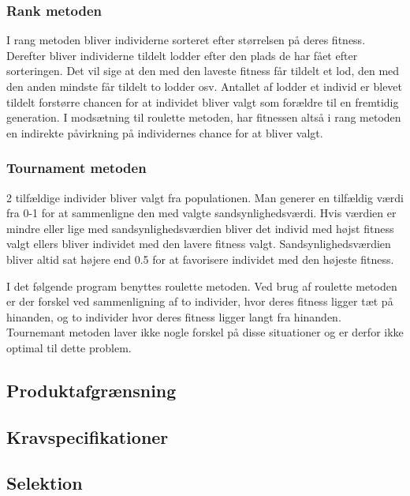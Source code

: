 \subsubsection{Rank metoden}

I rang metoden bliver individerne sorteret efter størrelsen på deres fitness. Derefter bliver individerne tildelt lodder efter den plads de har fået efter sorteringen. Det vil sige at den med den laveste fitness får tildelt et lod, den med den anden mindste får tildelt to lodder osv. Antallet af lodder et individ er blevet tildelt forstørre chancen for at individet bliver valgt som forældre til en fremtidig generation. I modsætning til roulette metoden, har fitnessen altså i rang metoden en indirekte påvirkning på individernes chance for at bliver valgt. 

\subsubsection{Tournament metoden}

2 tilfældige individer bliver valgt fra populationen. Man generer en tilfældig værdi fra 0-1 for at sammenligne den med valgte sandsynlighedsværdi. Hvis værdien er mindre eller lige med sandsynlighedsværdien bliver det individ med højst fitness valgt ellers bliver individet med den lavere fitness valgt. Sandsynlighedsværdien bliver altid sat højere end 0.5 for at favorisere individet med den højeste fitness. 

I det følgende program benyttes roulette metoden. Ved brug af roulette metoden er der forskel ved sammenligning af to individer, hvor deres fitness ligger tæt på hinanden, og to individer hvor deres fitness ligger langt fra hinanden. Tournemant metoden laver ikke nogle forskel på disse situationer og er derfor ikke optimal til dette problem.
\subsection{Produktafgrænsning}
  

\subsection{Kravspecifikationer}
  

\subsection{Selektion}
  